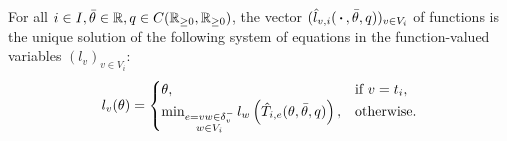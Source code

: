 
\begin{proposition}
    For all $i\in I, \bar\theta\in \mathbb{R}, q\in{C}{\left({\mathbb{R}_{\geq0}},{\mathbb{R}_{\geq0}}\right)}$, the vector $(\hat l_{v,i}(\,\boldsymbol{\cdot}\,,\bar\theta, q))_{v\in V_i}$ of functions is the unique solution of the following system of equations in the function-valued variables $(l_v)_{v\in V_i}$:
    \[
        l_v(\theta) = \begin{cases}
            \theta, &\text{if $v = t_i$}, \\
            \min_{\substack{
                e=vw\in\delta^-_{v}\\
                w \in V_i                
            }} l_w\left(
                \hat T_{i, e}(\theta, \bar\theta, q)
            \right), &\text{otherwise}.
        \end{cases}
    \]
\end{proposition}
